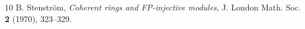 \documentclass[10pt,twoside]{amsart}
\theoremstyle{bfupright head,slanted body}
\theoremstyle{bfupright head,upright body}
\theoremstyle{fixed bf head,slanted body}
\theoremstyle{fixed bf head,upright body}
\theoremstyle{numbered paragraph}
\numberwithin{equation}{res}
\begin{document}
\begin{thebibliography}{10}
B. Stenstr\"{o}m, \emph{Coherent rings and FP-injective modules}, J. London Math. Soc. {\bf 2} (1970),
323--329.




\end{thebibliography}
\end{document}
